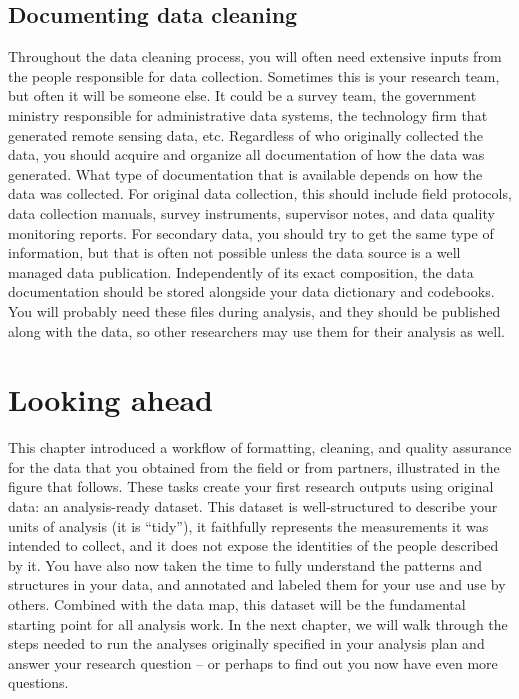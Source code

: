\subsection{Documenting data cleaning}

Throughout the data cleaning process,
you will often need extensive inputs from the people responsible for data collection.
Sometimes this is your research team, but often it will be someone else.
It could be a survey team, the government ministry responsible for administrative data systems,
the technology firm that generated remote sensing data, etc.
Regardless of who originally collected the data,
you should acquire and organize all documentation of how the data was generated.
What type of documentation that is available depends on how the data was collected.
For original data collection, this should include
field protocols, data collection manuals, survey instruments,
supervisor notes, and data quality monitoring reports.
For secondary data, you should try to get the same type of information,
but that is often not possible unless
the data source is a well managed data publication.
Independently of its exact composition,
the data documentation should be stored
alongside your data dictionary and codebooks.
You will probably need these files during analysis,
and they should be published along with the data,
so other researchers may use them for their analysis as well.

\section{Looking ahead}
This chapter introduced a workflow of formatting, cleaning, and quality assurance for
the data that you obtained from the field or from partners,
illustrated in the figure that follows.
These tasks create your first research outputs using original data:
an analysis-ready dataset.
This dataset is well-structured to describe your units of analysis (it is ``tidy''),
it faithfully represents the measurements it was intended to collect,
and it does not expose the identities of the people described by it.
You have also now taken the time to fully understand the patterns and structures
in your data, and annotated and labeled them for your use and use by others.
Combined with the data map, this dataset
will be the fundamental starting point for all analysis work.
In the next chapter, we will walk through the steps needed
to run the analyses originally specified in your analysis plan
and answer your research question --
or perhaps to find out you now have even more questions.

